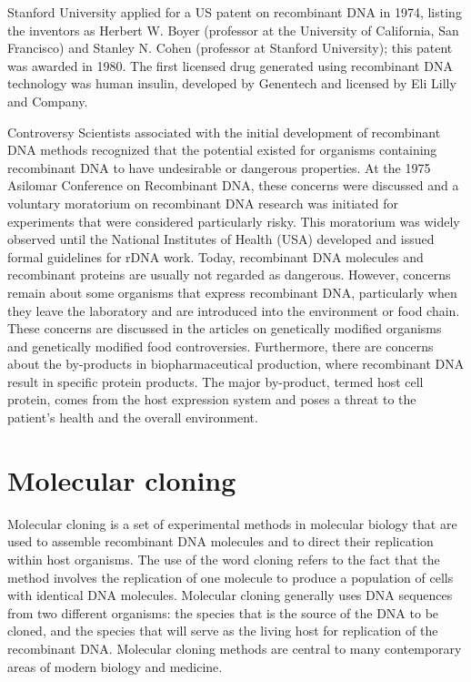 Stanford University applied for a US patent on recombinant DNA in 1974, listing the inventors as Herbert W. Boyer (professor at the University of California, San Francisco) and Stanley N. Cohen (professor at Stanford University); this patent was awarded in 1980. The first licensed drug generated using recombinant DNA technology was human insulin, developed by Genentech and licensed by Eli Lilly and Company.

Controversy
Scientists associated with the initial development of recombinant DNA methods recognized that the potential existed for organisms containing recombinant DNA to have undesirable or dangerous properties. At the 1975 Asilomar Conference on Recombinant DNA, these concerns were discussed and a voluntary moratorium on recombinant DNA research was initiated for experiments that were considered particularly risky. This moratorium was widely observed until the National Institutes of Health (USA) developed and issued formal guidelines for rDNA work. Today, recombinant DNA molecules and recombinant proteins are usually not regarded as dangerous. However, concerns remain about some organisms that express recombinant DNA, particularly when they leave the laboratory and are introduced into the environment or food chain. These concerns are discussed in the articles on genetically modified organisms and genetically modified food controversies. Furthermore, there are concerns about the by-products in biopharmaceutical production, where recombinant DNA result in specific protein products. The major by-product, termed host cell protein, comes from the host expression system and poses a threat to the patient's health and the overall environment.

\hypertarget{molecular-cloning}{%
\section{Molecular cloning}\label{molecular-cloning}}

Molecular cloning is a set of experimental methods in molecular biology that are used to assemble recombinant DNA molecules and to direct their replication within host organisms. The use of the word cloning refers to the fact that the method involves the replication of one molecule to produce a population of cells with identical DNA molecules. Molecular cloning generally uses DNA sequences from two different organisms: the species that is the source of the DNA to be cloned, and the species that will serve as the living host for replication of the recombinant DNA. Molecular cloning methods are central to many contemporary areas of modern biology and medicine.

